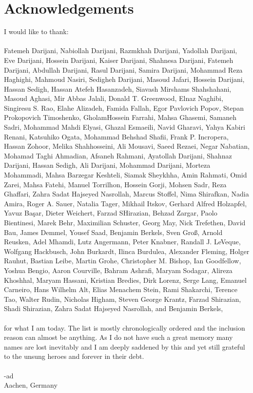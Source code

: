 \chapter*{Acknowledgements}


I would like to thank:\\\\
\noindent Fatemeh Darijani, Nabiollah Darijani, Razmkhah Darijani, Yadollah Darijani, Eve Darijani, Hossein Darijani, 
Kaiser Darijani, Shahnesa Darijani, Fatemeh Darijani, Abdullah Darijani, Rasul Darijani, Samira Darijani, 
Mohammad Reza Haghighi, Mahmoud Nasiri, Sedigheh Darijani, Masoud Jafari, Hossein Darijani, Hassan Sedigh, 
Hassan Atefeh Hasanzadeh, Siavash Mirshams Shahshahani, Masoud Aghasi, Mir Abbas Jalali, Donald T. Greenwood, Elnaz Naghibi, 
Singiresu S. Rao, Elahe Alizadeh, Famida Fallah, Egor Pavlovich Popov, Stepan Prokopovich Timoshenko, GholamHossein Farrahi, 
Mahsa Ghasemi, Samaneh Sadri, Mohammad Mahdi Elyasi, Ghazal Esmaeili, Navid Gharavi, Yahya Kabiri Renani, Katsuhiko Ogata, 
Mohammad Behshad Shafii, Frank P. Incropera, Hassan Zohoor, Melika Shahhosseini, Ali Mousavi, Saeed Rezaei, Negar Nabatian, 
Mohamad Taghi Ahmadian, Afsaneh Rahmani, Ayatollah Darijani, Shahnaz Darijani, Hassan Sedigh, Ali Darijani, 
Mohammad Darijani, Morteza Mohammadi, Mahsa Barzegar Keshteli, Siamak Sheykhha, Amin Rahmati, Omid Zarei, Mahsa Fatehi, 
Manuel Torrilhon, Hossein Gorji, Mohsen Sadr, Reza Ghaffari, Zahra Sadat Hajseyed Nasrollah, Marcus Stoffel, 
Nima Shirafkan, Nadia Amira, Roger A. Sauer, Natalia Tager, Mikhail Itskov, Gerhard Alfred Holzapfel, Yavuz Başar, 
Dieter Weichert, Farzad SHirazian, Behzad Zargar, Paolo Bientinesi, Marek Behr, Maximilian Schuster, Georg May, 
Nick Trefethen, David Bau{\MakeUppercase{}}, James Demmel, Yousef Saad, Benjamin Berkels, Sven Groß, 
Arnold Reusken, Adel Mhamdi, Lutz Angermann, Peter Knabner, Randall J. LeVeque, Wolfgang Hackbusch, John Burkardt, 
Ilinca Burdulea, Alexander Fleming, Holger Rauhut, Bastian Leibe, Martin Grohe, Christopher M. Bishop, Ian Goodfellow, 
Yoshua Bengio, Aaron Courville, Bahram Ashrafi, Maryam Sodagar, Alireza Khoshhal, Maryam Hassani, Kristian Bredies, 
Dirk Lorenz, Serge Lang, Emanuel Carneiro, Hans Wilhelm Alt, Elias Menachem Stein, Rami Shakarchi, Terence Tao, Walter Rudin, Nicholas Higham, 
Steven George Krantz, Farzad Shirazian, Shadi Shirazian, Zahra Sadat Hajseyed Nasrollah, 
and Benjamin Berkels,\\\\
for what I am today. The list is mostly chronologically ordered and the inclusion reason can almost be anything. 
As I do not have such a great memory many names are lost inevitably and I am deeply saddened by this and yet still 
grateful to the unsung heroes  and forever in their debt.
\\\\
-ad\\
Aachen, Germany\\

\endinput